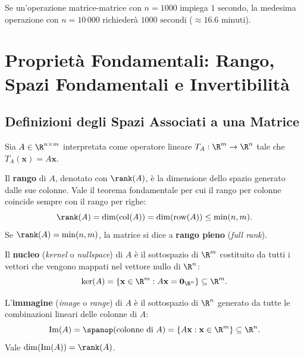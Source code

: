 Se un'operazione matrice-matrice con $n = 1000$ impiega $1\text{ secondo}$, la medesima operazione con $n = 10\,000$ richieder\`a $1000\text{ secondi}$ ($\approx 16.6\text{ minuti}$).

\FloatBarrier
\section{Propriet\`a Fondamentali: Rango, Spazi Fondamentali e Invertibilit\`a}

\subsection{Definizioni degli Spazi Associati a una Matrice}

Sia $A \in \R^{n \times m}$ interpretata come operatore lineare $T_A: \R^m \to \R^n$ tale che $T_A(\mathbf{x}) = A\mathbf{x}$.

\begin{definition}
Il \textbf{rango} di $A$, denotato con $\rank(A)$, \`e la dimensione dello spazio generato dalle sue colonne. Vale il teorema fondamentale per cui il rango per colonne coincide sempre con il rango per righe:
\begin{equation}
    \rank(A) = \dim(\mathrm{col}(A)) = \dim(\mathrm{row}(A)) \le \min(n, m).
\end{equation}
Se $\rank(A) = \min(n, m)$, la matrice si dice a \textbf{rango pieno} (\textit{full rank}).
\end{definition}

\begin{definition}
Il \textbf{nucleo} (\textit{kernel} o \textit{nullspace}) di $A$ \`e il sottospazio di $\R^m$ costituito da tutti i vettori che vengono mappati nel vettore nullo di $\R^n$:
\begin{equation}
    \ker(A) = \left\{ \mathbf{x} \in \R^m : A\mathbf{x} = \mathbf{0}_{\R^n} \right\} \subseteq \R^m.
\end{equation}
\end{definition}

\begin{definition}
L'\textbf{immagine} (\textit{image} o \textit{range}) di $A$ \`e il sottospazio di $\R^n$ generato da tutte le combinazioni lineari delle colonne di $A$:
\begin{equation}
    \mathrm{Im}(A) = \spanop(\text{colonne di } A) = \left\{ A\mathbf{x} : \mathbf{x} \in \R^m \right\} \subseteq \R^n.
\end{equation}
Vale $\dim(\mathrm{Im}(A)) = \rank(A)$.
\end{definition}

